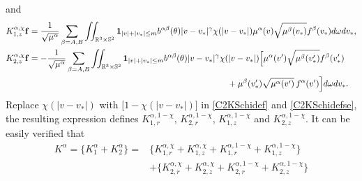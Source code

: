 \documentclass[reqno]{amsart}
\numberwithin{equation}{section}
\numberwithin{equation}{section}
\begin{document}
	and
	\begin{equation}\label{C2KSchidefse}
		\begin{split}
			&	 K_{1,z}^{\alpha,\chi} \mathbf{f}=  \frac{1}{\sqrt{\mu^\alpha}} \sum_{\beta=A,B} \iint_{\mathbb{R}^3 \times \mathbb{S}^2}\mathbf{1}_{|v|+|v_*|\leq m}
			b^{ \alpha \beta}(\theta)|v-v_*|^{\gamma} \chi(|v-v_*|) \mu^\alpha(v) \sqrt{\mu^\beta(v_*)}f^\beta(v_*)   d\omega dv_*,\\
			&	 K_{2,z}^{\alpha,\chi} \mathbf{f}= - \frac{1}{\sqrt{\mu^\alpha}} \sum_{\beta=A,B} \iint_{\mathbb{R}^3 \times \mathbb{S}^2}\mathbf{1}_{|v|+|v_*|\leq m}
			b^{ \alpha \beta}(\theta)|v-v_*|^{\gamma}\chi(|v-v_*|) \Big[\mu^\alpha(v')\sqrt{\mu^\beta(v_*')}f^\beta(v_*')\\
			& \hspace{9.1cm} +\mu^{\beta}(v_*') \sqrt{\mu^{\alpha}(v')}\, f^\alpha(v')\Big] d\omega dv_*.
		\end{split}	
	\end{equation}	
	Replace ‌$\chi(|v-v_*|)$ with ‌$\big[1-\chi(|v-v_*|)\big]$ in ‌\eqref{C2KSchidef} and \eqref{C2KSchidefse}, the resulting expression defines ‌$K_{1,r}^{\alpha,1-\chi} ,\,K_{2,r}^{\alpha,1-\chi} ,\,K_{1,z}^{\alpha,1-\chi} $ and ‌$K_{2,z}^{\alpha,1-\chi} $. It can be easily verified‌ that
	\begin{equation}\label{2121212Q1569}
		\begin{split}
		K^{\alpha} =\big\{K^{\alpha}_1+K^{\alpha}_2\big\} =&\big\{K_{1,r}^{\alpha,\chi}+K_{1,z}^{\alpha,\chi}+K_{1,r}^{\alpha,1-\chi}+K_{1,z}^{\alpha,1-\chi}\big\}\\
		&+\big\{K_{2,r}^{\alpha,\chi}+K_{2,z}^{\alpha,\chi}+K_{2,r}^{\alpha,1-\chi}+K_{2,z}^{\alpha,1-\chi}\big\}
		\end{split}	
	\end{equation}	
	
\end{document}
